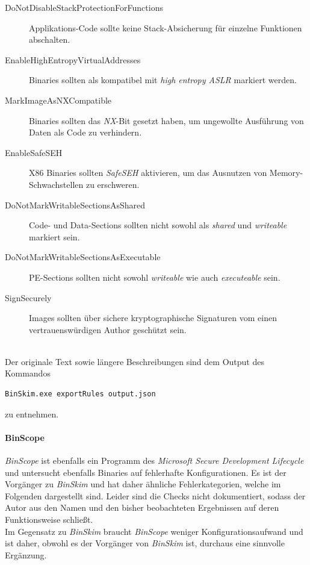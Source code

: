 \begin{description}
	\item[DoNotDisableStackProtectionForFunctions] Applikations-Code sollte keine Stack-Absicherung für einzelne Funktionen abschalten.
	
	\item[EnableHighEntropyVirtualAddresses] Binaries sollten als kompatibel mit \textit{high entropy ASLR} markiert werden.
	
	\item[MarkImageAsNXCompatible] Binaries sollten das \textit{NX}-Bit gesetzt haben, um ungewollte Ausführung von Daten als Code zu verhindern.
	
	\item[EnableSafeSEH] X86 Binaries sollten \textit{SafeSEH} aktivieren, um das Ausnutzen von Memory-Schwachstellen zu erschweren.
	
	\item[DoNotMarkWritableSectionsAsShared] Code- und Data-Sections sollten nicht sowohl als \textit{shared} und \textit{writeable} markiert sein.
	
	\item[DoNotMarkWritableSectionsAsExecutable] PE-Sections sollten nicht sowohl \textit{writeable} wie auch \textit{executeable} sein.
	
	\item[SignSecurely] Images sollten über sichere kryptographische Signaturen vom einen vertrauenswürdigen Author geschützt sein.
\end{description}
$ $\\
Der originale Text sowie längere Beschreibungen sind dem Output des Kommandos
\begin{lstlisting}
BinSkim.exe exportRules output.json
\end{lstlisting}
zu entnehmen.

\paragraph{BinScope}
\textit{BinScope} ist ebenfalls ein Programm des \textit{Microsoft Secure Development Lifecycle} und untersucht ebenfalls Binaries auf fehlerhafte Konfigurationen. Es ist der Vorgänger zu \textit{BinSkim} und hat daher ähnliche Fehlerkategorien, welche im Folgenden dargestellt sind. Leider sind die Checks nicht dokumentiert, sodass der Autor aus den Namen und den bisher beobachteten Ergebnissen auf deren Funktionsweise schließt. \\

Im Gegensatz zu \textit{BinSkim} braucht \textit{BinScope} weniger Konfigurationsaufwand und ist daher, obwohl es der Vorgänger von \textit{BinSkim} ist, durchaus eine sinnvolle Ergänzung.


